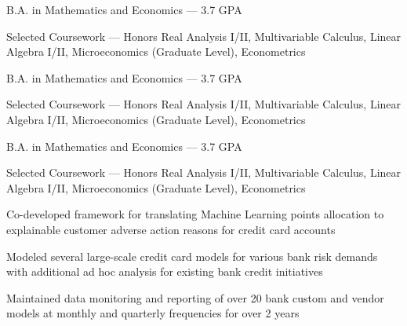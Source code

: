 \documentclass{resume}
\begin{document}
\begin{education}

    \begin{description}
        \item B.A. in Mathematics and Economics --- 3.7 GPA
        \item Selected Coursework ---
            Honors Real Analysis I/II, 
            Multivariable Calculus, 
            Linear Algebra I/II, Microeconomics (Graduate Level), 
            Econometrics
    \end{description}
    
    \begin{description}
        \item B.A. in Mathematics and Economics --- 3.7 GPA
        \item Selected Coursework ---
            Honors Real Analysis I/II, 
            Multivariable Calculus, 
            Linear Algebra I/II, Microeconomics (Graduate Level), 
            Econometrics
    \end{description}

    \begin{description}
        \item B.A. in Mathematics and Economics --- 3.7 GPA
        \item Selected Coursework ---
            Honors Real Analysis I/II, 
            Multivariable Calculus, 
            Linear Algebra I/II, Microeconomics (Graduate Level), 
            Econometrics
    \end{description}  
\end{education}

\begin{experience}
    \begin{description}
        \item Co-developed framework for translating Machine Learning points allocation to explainable customer adverse action reasons for credit card accounts
        \item Modeled several large-scale credit card models for various bank risk demands with additional ad hoc analysis for existing bank credit initiatives
        \item Maintained data monitoring and reporting of over 20 bank custom and vendor models at monthly and quarterly frequencies for over 2 years
    \end{description}

\end{experience}
\end{document}
